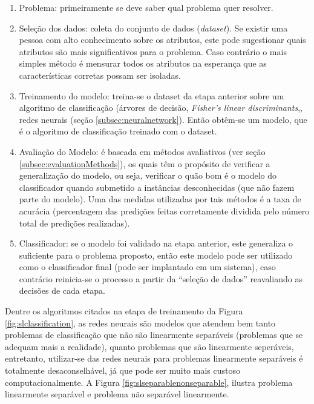 \begin{enumerate}
\item Problema: primeiramente se deve saber qual problema quer resolver.
\item Seleção dos dados: coleta do conjunto de dados (\textit{dataset}). Se existir uma pessoa com alto conhecimento sobre os atributos, este pode sugestionar quais atributos são mais significativos para o problema. Caso contrário o mais simples método é mensurar todos os atributos na esperança que as características corretas possam ser isoladas.\cite{Kotsiantis:2007}
\item Treinamento do modelo: treina-se o dataset da etapa anterior sobre um algoritmo de classificação (árvores de decisão, \textit{Fisher’s linear discriminants},\cite{Michie:1994}, redes neurais (seção \ref{subsec:neuralnetwork}). Então obtêm-se um modelo, que é o algoritmo de classificação treinado com o dataset.
\item Avaliação do Modelo: é baseada em métodos avaliativos (ver seção \ref{subsec:evaluationMethods}), os quais têm o propósito de verificar a generalização do modelo, ou seja, verificar o quão bom é o modelo do classificador quando submetido a instâncias desconhecidas (que não fazem parte do modelo). Uma das medidas utilizadas por tais métodos é a taxa de acurácia (percentagem das predições feitas corretamente dividida pelo número total de predições realizadas).\cite{Kotsiantis:2007}
\item Classificador: se o modelo foi validado na etapa anterior, este generaliza o suficiente para o problema proposto, então este modelo pode ser utilizado como o classificador final (pode ser implantado em um sistema), caso contrário reinicia-se o processo a partir da ``seleção de dados'' reavaliando as decisões de cada etapa.
\end{enumerate}

Dentre os algoritmos citados na etapa de treinamento da Figura \ref{fig:slclassification}, as redes neurais são modelos que atendem bem tanto problemas de classificação que não são linearmente separáveis (problemas que se adequam mais a realidade), quanto problemas que são linearmente seperáveis, entretanto, utilizar-se das redes neurais para problemas linearmente separáveis é totalmente desaconselhável, já que pode ser muito mais custoso computacionalmente.\cite{Zhang:2000}\cite{Elizondo:2006} A Figura \ref{fig:slseparablenonseparable}, ilustra problema linearmente separável e problema não separável linearmente.

